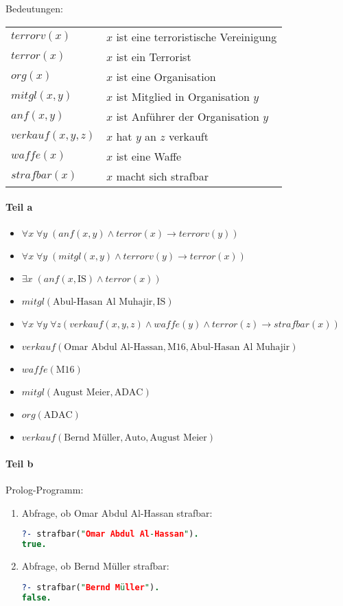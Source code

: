 Bedeutungen:\\
\begin{tabular}{l l}
$terrorv(x)$ & $x$ ist eine terroristische Vereinigung\\
$terror(x)$ & $x$ ist ein Terrorist\\
$org(x)$ & $x$ ist eine Organisation\\
$mitgl(x,y)$ & $x$ ist Mitglied in Organisation $y$\\
$anf(x,y)$ & $x$ ist Anführer der Organisation $y$\\
$verkauf(x,y,z)$ & $x$ hat $y$ an $z$ verkauft\\
$waffe(x)$ & $x$ ist eine Waffe\\
$strafbar(x)$ & $x$ macht sich strafbar
\end{tabular}
\paragraph*{Teil a}
\begin{itemize}
\item $\forall x\; \forall y\;(anf(x,y) \wedge terror(x) \to terrorv(y) )$
\item $\forall x\;\forall y\; (mitgl(x,y) \wedge terrorv(y) \to terror(x))$
\item $\exists x\; (anf(x,\text{IS}) \wedge terror(x))$
\item $mitgl(\text{Abul-Hasan Al Muhajir},\text{IS})$
\item $\forall x\; \forall y\; \forall z ( verkauf(x,y,z) \wedge waffe(y) \wedge terror(z) \to strafbar(x))$
\item $verkauf(\text{Omar Abdul Al-Hassan},\text{M16},\text{Abul-Hasan Al Muhajir})$
\item $waffe(\text{M16})$
\item $mitgl(\text{August Meier}, \text{ADAC})$
\item $org(\text{ADAC})$
\item $verkauf(\text{Bernd Müller}, \text{Auto},\text{August Meier})$
\end{itemize}

\paragraph*{Teil b}
Prolog-Programm:

\begin{enumerate}[label=(\roman*)]
\item Abfrage, ob Omar Abdul Al-Hassan strafbar:
\begin{lstlisting}[language=Prolog]
?- strafbar("Omar Abdul Al-Hassan").
true.
\end{lstlisting}
\item Abfrage, ob Bernd Müller strafbar:
\begin{lstlisting}[language=Prolog]
?- strafbar("Bernd Müller").
false.
\end{lstlisting}
\end{enumerate}
